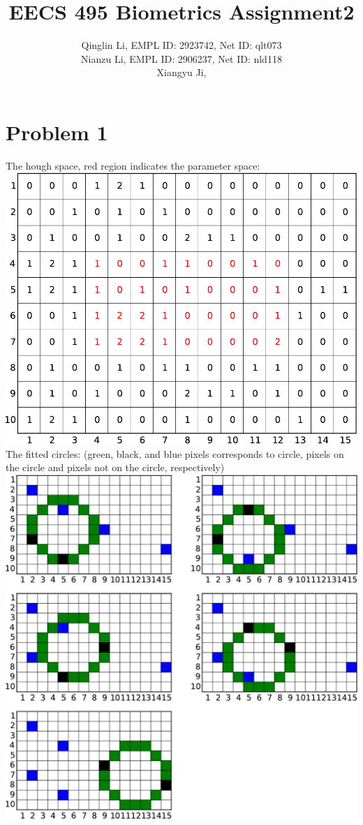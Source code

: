 \documentclass[12pt]{article}
\date{}
\title{EECS 495 Biometrics Assignment2}
\author{Qinglin Li, EMPL ID: 2923742, Net ID: qlt073\\ Nianzu Li, EMPL ID: 2906237, Net ID: nld118\\ Xiangyu Ji,}
\begin{document}
\maketitle
\section*{Problem 1}
The hough space, red region indicates the parameter space:\\
\includegraphics[scale =1]{p1-voting-crop}\\
The fitted circles: (green, black, and blue pixels corresponds to circle, pixels on the circle and pixels not on the circle, respectively)\\
\includegraphics[scale=0.8]{p1-circles-crop}
\end{document}
